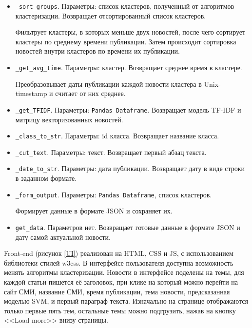 \begin{itemize}
    \item \verb|_sort_groups|. Параметры: список кластеров, полученный от
    алгоритмов кластеризации. Возвращает отсортированный список кластеров.

    Фильтрует кластеры, в которых меньше двух новостей, после чего сортирует кластеры по среднему времени публикации.
    Затем происходит сортировка новостей внутри кластеров по времени их публикации.

    \item \verb|_get_avg_time|. Параметры: кластер. Возвращает среднее время
    в кластере.

    Преобразовывает даты публикации каждой новости кластера в Unix-timestamp и
    считает от них среднее.

    \item \verb|_get_TFIDF|. Параметры: \verb|Pandas Dataframe|.
    Возвращает модель TF-IDF и матрицу векторизованных новостей.

    \item \verb|_class_to_str|. Параметры: id класса.
    Возвращает название класса.

    \item \verb|_cut_text|. Параметры: текст.
    Возвращает первый абзац текста.

    \item \verb|_date_to_str|. Параметры: дата публикации.
    Возвращает дату в виде строки в заданном формате.

    \item \verb|_form_output|. Параметры: \verb|Pandas Dataframe|, список
    кластеров.

    Формирует данные в формате JSON и сохраняет их.

    \item \verb|get_data|. Параметров нет.
    Возвращает готовые данные в формате JSON и дату самой актуальной новости.
\end{itemize}

Front-end (рисунок \ref{UI}) реализован на HTML, CSS и JS, с использованием библиотеки стилей w3css. 
В интерфейсе пользователя доступна возможность менять алгоритмы кластеризации. Новости в интерфейсе
поделены на темы, для каждой статьи пишется её заголовок, при клике на который можно
перейти на сайт СМИ, название СМИ, время публикации, тема новости, предсказанная моделью SVM,
и первый параграф текста. Изначально на странице отображаются только первые пять тем,
остальные темы можно подгрузить, нажав на кнопку <<Load more>> внизу страницы.

